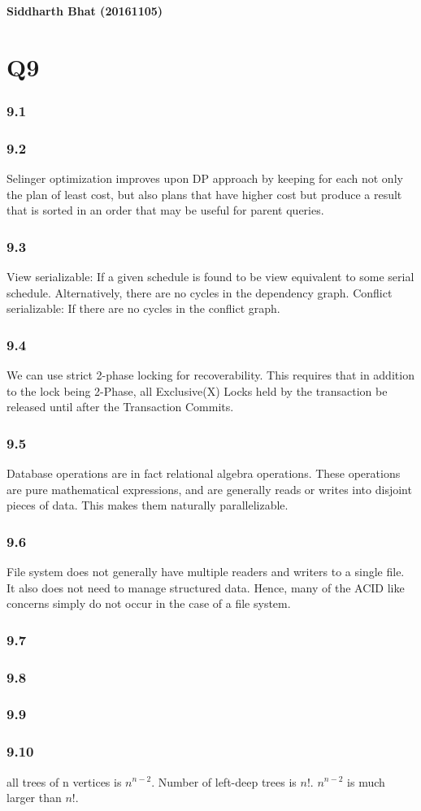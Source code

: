 \documentclass{article}
\begin{document}
\textbf{Siddharth Bhat (20161105)}
\section{Q9}
\subsubsection{9.1}
\subsubsection{9.2}
Selinger optimization improves upon DP approach by keeping for
each  not only the plan of least cost, but also plans that have higher
cost but produce a result that is sorted in an order that may
be useful for parent queries.
\subsubsection{9.3}

View serializable: If a given schedule is found to be view equivalent to some serial schedule. Alternatively,
  there are no cycles in the dependency graph.
Conflict serializable: If there are no cycles in the conflict graph.


\subsubsection{9.4}

We can use strict 2-phase locking for recoverability. This requires that
in addition to the lock being 2-Phase, all Exclusive(X) Locks held by the
transaction be released until after the Transaction Commits.

\subsubsection{9.5}
Database operations are in fact relational algebra operations. These
operations are pure mathematical expressions, and are generally reads or
writes into disjoint pieces of data. This makes them naturally parallelizable.


\subsubsection{9.6}
File system does not generally have multiple readers and writers to a single
file. It also does not need to manage structured data. Hence, many of the ACID
like concerns simply do not occur in the case of a file system.

\subsubsection{9.7}
\subsubsection{9.8}
\subsubsection{9.9}
\subsubsection{9.10}
all trees of n vertices is $n^{n-2}$. Number of left-deep trees is $n!$.
$n^{n-2}$ is much larger than $n!$.
\end{document}
